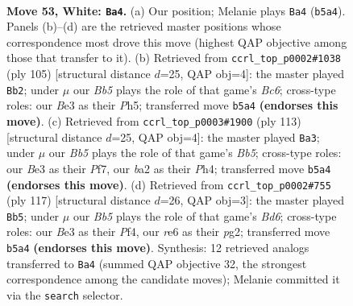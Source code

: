\documentclass[11pt]{article}
\begin{document}
\clearpage

\begin{figure}[p]\centering
\begin{subfigure}{0.46\textwidth}\centering
\resizebox{\linewidth}{!}{%
\newchessgame
\chessboard[
  setfen={7k/2R5/4r3/1B6/4p2p/4Bp1P/b4P2/5K2 w - - 16 53},
  showmover=false,
  pgfstyle=straightmove, color=movearrow, markmove={b5-a4}
]}
\caption{}
\end{subfigure}\hfill
\begin{subfigure}{0.46\textwidth}\centering
\resizebox{\linewidth}{!}{%
\newchessgame
\chessboard[
  setfen={8/6k1/6p1/6Pp/1p3P2/2b1K3/P5B1/8 b - - 31 53},
  showmover=false,
  pgfstyle=straightmove, color=movearrow, markmove={c3-b2}
]}
\caption{}
\end{subfigure}
\\[4pt]
\begin{subfigure}{0.46\textwidth}\centering
\resizebox{\linewidth}{!}{%
\newchessgame
\chessboard[
  setfen={8/4kp2/1p6/p3P3/Pb2K2p/1P5B/8/8 b - - 31 57},
  showmover=false,
  pgfstyle=straightmove, color=movearrow, markmove={b4-a3}
]}
\caption{}
\end{subfigure}\hfill
\begin{subfigure}{0.46\textwidth}\centering
\resizebox{\linewidth}{!}{%
\newchessgame
\chessboard[
  setfen={8/1p6/p7/P4k2/1P3p2/2Bb1P2/6P1/6K1 b - - 26 59},
  showmover=false,
  pgfstyle=straightmove, color=movearrow, markmove={d3-b5}
]}
\caption{}
\end{subfigure}
\caption{\textbf{Move 53, White: \texttt{Ba4}.} (a) Our position; Melanie plays \texttt{Ba4} (\texttt{b5a4}). Panels (b)--(d) are the retrieved master positions whose correspondence most drove this move (highest QAP objective among those that transfer to it). (b) Retrieved from \texttt{ccrl\_top\_p0002\#1038} (ply 105) [structural distance $d$=25, QAP obj=4]: the master played \texttt{Bb2}; under $\mu$ our \emph{Bb5} plays the role of that game's \emph{Bc6}; cross-type roles: our \emph{B}e3 as their \emph{P}h5; transferred move \texttt{b5a4} \textbf{(endorses this move)}. (c) Retrieved from \texttt{ccrl\_top\_p0003\#1900} (ply 113) [structural distance $d$=25, QAP obj=4]: the master played \texttt{Ba3}; under $\mu$ our \emph{Bb5} plays the role of that game's \emph{Bb5}; cross-type roles: our \emph{B}e3 as their \emph{P}f7, our \emph{b}a2 as their \emph{P}h4; transferred move \texttt{b5a4} \textbf{(endorses this move)}. (d) Retrieved from \texttt{ccrl\_top\_p0002\#755} (ply 117) [structural distance $d$=26, QAP obj=3]: the master played \texttt{Bb5}; under $\mu$ our \emph{Bb5} plays the role of that game's \emph{Bd6}; cross-type roles: our \emph{B}e3 as their \emph{P}f4, our \emph{r}e6 as their \emph{p}g2; transferred move \texttt{b5a4} \textbf{(endorses this move)}. Synthesis: 12 retrieved analogs transferred to \texttt{Ba4} (summed QAP objective 32, the strongest correspondence among the candidate moves); Melanie committed it via the \texttt{search} selector.}
\label{fig:thought-m104}
\end{figure}
\end{document}
